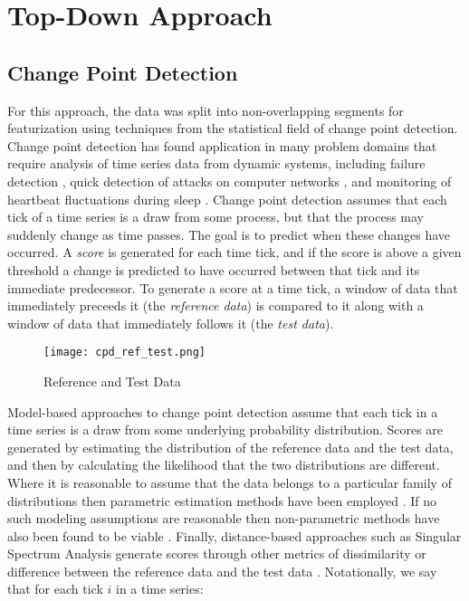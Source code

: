 \chapter{Top-Down Approach}
\section{Change Point Detection}
For this approach, the data was split into non-overlapping segments for
featurization using techniques from the statistical field of change point detection.
Change point detection has found application in many problem domains that require analysis of time series data
from dynamic systems, including failure detection \cite{bae13}, quick detection of
attacks on computer networks \cite{tartakovsky06}, and monitoring of heartbeat fluctuations during
sleep \cite{staudacher05}. Change point detection assumes that each tick of a time series is a draw from some
process, but that the process may suddenly change as time passes.
The goal is to predict when these changes have occurred.
A \emph{score} is generated for each time tick, and if the score is
above a given threshold a change is predicted to have occurred between that tick
and its immediate predecessor. To generate a score at
a time tick, a window of data that immediately preceeds it (the
\emph{reference data}) is compared to it along with a window of data that immediately follows it
(the \emph{test data}).

\begin{figure}
 \centering
 \texttt{[image: cpd\_ref\_test.png]}
 \caption{Reference and Test Data \cite{sugiyama09}}
 \label{fig:cpd_ref_test.png}
\end{figure}

Model-based approaches to change point detection assume that each tick in
a time series is a draw from some underlying probability distribution.
Scores are generated by estimating the distribution of the reference data
and the test data, and then by calculating the likelihood
that the two distributions are different.
Where it is reasonable to assume that the data belongs to a particular
family of distributions then parametric estimation methods have been employed
\cite{thatte11}. If no such modeling assumptions are reasonable then 
non-parametric methods have also been found to be viable \cite{matteson12}.
Finally, distance-based approaches such as Singular Spectrum Analysis
generate scores through other metrics of 
dissimilarity or difference between the reference data and the test data
\cite{moskvina03}.
Notationally, we say that for each tick $i$ in a time series:


